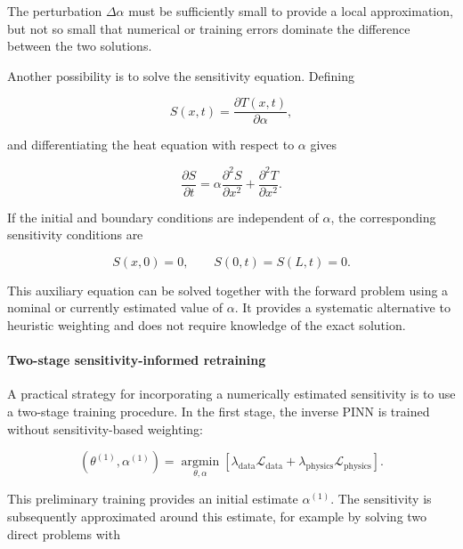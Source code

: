 The perturbation $\Delta\alpha$ must be sufficiently small to provide a local
approximation, but not so small that numerical or training errors dominate the
difference between the two solutions.

Another possibility is to solve the sensitivity equation. Defining

\begin{equation}
S(x,t)
=
\frac{\partial T(x,t)}{\partial\alpha},
\end{equation}

and differentiating the heat equation with respect to $\alpha$ gives

\begin{equation}
\frac{\partial S}{\partial t}
=
\alpha
\frac{\partial^2S}{\partial x^2}
+
\frac{\partial^2T}{\partial x^2}.
\end{equation}

If the initial and boundary conditions are independent of $\alpha$, the
corresponding sensitivity conditions are

\begin{equation}
S(x,0)=0,
\qquad
S(0,t)=S(L,t)=0.
\end{equation}

This auxiliary equation can be solved together with the forward problem using a
nominal or currently estimated value of $\alpha$. It provides a systematic
alternative to heuristic weighting and does not require knowledge of the exact
solution.

\paragraph{Two-stage sensitivity-informed retraining}

A practical strategy for incorporating a numerically estimated sensitivity is to
use a two-stage training procedure. In the first stage, the inverse PINN is trained
without sensitivity-based weighting:

\begin{equation}
\left(
\theta^{(1)},\alpha^{(1)}
\right)
=
\underset{\theta,\alpha}{\operatorname{argmin}}
\left[
\lambda_{\mathrm{data}}
\mathcal{L}_{\mathrm{data}}
+
\lambda_{\mathrm{physics}}
\mathcal{L}_{\mathrm{physics}}
\right].
\end{equation}

This preliminary training provides an initial estimate $\alpha^{(1)}$. The
sensitivity is subsequently approximated around this estimate, for example by
solving two direct problems with

